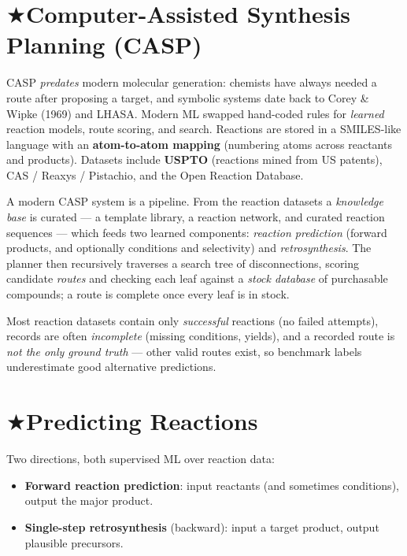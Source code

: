 \documentclass[11pt, oneside]{book}
\makeatletter
\newcommand{\starglyph}{\textcolor{stargold}{\ensuremath{\bigstar}}}
\newcommand{\starsec}[1]{%
  \texorpdfstring{\starglyph\hspace{0.4em}\textcolor{star@frame}{#1}}{#1}}
\makeatother
\begin{document}
\section{\starsec{Computer-Assisted Synthesis Planning (CASP)}}

CASP \emph{predates} modern molecular generation: chemists have always needed a
route after proposing a target, and symbolic systems date back to Corey \& Wipke
(1969) and LHASA. Modern ML swapped hand-coded rules for \emph{learned} reaction
models, route scoring, and search. Reactions are stored in a SMILES-like language
with an \textbf{atom-to-atom mapping} (numbering atoms across reactants and
products). Datasets include \textbf{USPTO} (reactions mined from US patents), CAS /
Reaxys / Pistachio, and the Open Reaction Database.

A modern CASP system is a pipeline. From the reaction datasets a \emph{knowledge
base} is curated --- a template library, a reaction network, and curated reaction
sequences --- which feeds two learned components: \emph{reaction prediction} (forward
products, and optionally conditions and selectivity) and \emph{retrosynthesis}. The
planner then recursively traverses a search tree of disconnections, scoring candidate
\emph{routes} and checking each leaf against a \emph{stock database} of purchasable
compounds; a route is complete once every leaf is in stock.

\begin{notebox}[title={Reaction data is biased}]
Most reaction datasets contain only \emph{successful} reactions (no failed
attempts), records are often \emph{incomplete} (missing conditions, yields), and a
recorded route is \emph{not the only ground truth} --- other valid routes exist, so
benchmark labels underestimate good alternative predictions.
\end{notebox}

\section{\starsec{Predicting Reactions}}

Two directions, both supervised ML over reaction data:

\begin{itemize}
  \item \textbf{Forward reaction prediction}: input reactants (and sometimes
        conditions), output the major product.
  \item \textbf{Single-step retrosynthesis} (backward): input a target product,
        output plausible precursors.
\end{itemize}
\end{document}
